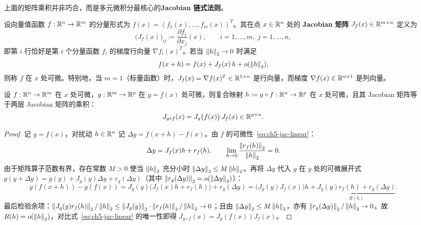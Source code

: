 上面的矩阵乘积并非巧合，而是多元微积分最核心的\textbf{Jacobian 链式法则}。

\begin{defBox}
\begin{definition}[Jacobian 矩阵]\label{def:ch5-jacobian}
设向量值函数 $f:\mathbb{R}^n\to\mathbb{R}^m$ 的分量形式为 $f(x) = (f_1(x), \dots, f_m(x))^T$。其在点 $x\in\mathbb{R}^n$ 处的 \textbf{Jacobian 矩阵} $J_f(x) \in \mathbb{R}^{m\times n}$ 定义为
\[
  \big(J_f(x)\big)_{ij} \coloneqq \frac{\partial f_i}{\partial x_j}(x),
  \qquad i=1,\dots,m,\; j=1,\dots,n,
\]
即第 $i$ 行恰好是第 $i$ 个分量函数 $f_i$ 的梯度行向量 $\nabla f_i(x)^T$。若当 $\left\|h\right\|_2\to 0$ 时满足
\begin{equation}\label{eq:ch5-jac-linear}
  f(x + h) = f(x) + J_f(x)\,h + o(\left\|h\right\|_2),
\end{equation}
则称 $f$ 在 $x$ 处可微。特别地，当 $m=1$（标量函数）时，$J_f(x) = \nabla f(x)^T \in \mathbb{R}^{1\times n}$ 是行向量，而梯度 $\nabla f(x) \in \mathbb{R}^{n\times 1}$ 是列向量。
\end{definition}
\end{defBox}

\begin{thmBox}
\begin{theorem}[多元链式法则]\label{thm:ch5-chain}
设 $f:\mathbb{R}^n\to\mathbb{R}^m$ 在 $x$ 处可微，$g:\mathbb{R}^m\to\mathbb{R}^p$ 在 $y = f(x)$ 处可微，则复合映射 $h \coloneqq g \circ f : \mathbb{R}^n\to\mathbb{R}^p$ 在 $x$ 处可微，且其 Jacobian 矩阵等于两层 Jacobian 矩阵的乘积：
\begin{equation}\label{eq:ch5-chain}
  J_{g\circ f}(x) = J_g\big(f(x)\big)\, J_f(x) \in \mathbb{R}^{p\times n}.
\end{equation}
\end{theorem}
\end{thmBox}

\begin{proof}
记 $y = f(x)$，对扰动 $h\in\mathbb{R}^n$ 记 $\Delta y = f(x+h) - f(x)$。由 $f$ 的可微性~\eqref{eq:ch5-jac-linear}：
\[
  \Delta y = J_f(x) h + r_f(h), \qquad \lim_{h\to 0}\frac{\left\|r_f(h)\right\|_2}{\left\|h\right\|_2} = 0.
\]
由于矩阵算子范数有界，存在常数 $M>0$ 使当 $\left\|h\right\|_2$ 充分小时 $\left\|\Delta y\right\|_2 \le M\left\|h\right\|_2$。再将 $\Delta y$ 代入 $g$ 在 $y$ 处的可微展开式 $g(y+\Delta y) = g(y) + J_g(y)\Delta y + r_g(\Delta y)$（其中 $\left\|r_g(\Delta y)\right\|_2 = o(\left\|\Delta y\right\|_2)$）：
\[
  g(f(x+h)) - g(f(x))
  = J_g(y)\big(J_f(x)h + r_f(h)\big) + r_g(\Delta y)
  = \big(J_g(y) J_f(x)\big) h + \underbrace{J_g(y) r_f(h) + r_g(\Delta y)}_{R(h)}.
\]
最后检验余项：$\left\|J_g(y) r_f(h)\right\|_2 / \left\|h\right\|_2 \le \left\|J_g(y)\right\|_2 \cdot \left\|r_f(h)\right\|_2/\left\|h\right\|_2 \to 0$；且由 $\left\|\Delta y\right\|_2 \le M\left\|h\right\|_2$，亦有 $\left\|r_g(\Delta y)\right\|_2 / \left\|h\right\|_2 \to 0$。故 $R(h) = o(\left\|h\right\|_2)$，对比式~\eqref{eq:ch5-jac-linear} 的唯一性即得 $J_{g\circ f}(x) = J_g(f(x)) J_f(x)$。
\end{proof}

